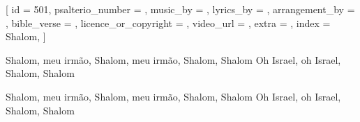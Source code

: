 % 

[
    id                     = {501},
    psalterio_number       = {},
    music_by               = {},
    lyrics_by              = {},
    arrangement_by         = {},
    bible_verse            = {},
    licence_or_copyright   = {},
    video_url              = {},
    extra                  = {},
    index                  = {Shalom},
]


\beginverse
Shalom, meu irmão, Shalom, meu irmão, Shalom, Shalom
Oh Israel, oh Israel, Shalom, Shalom
\endverse


\beginverse
Shalom, meu irmão, Shalom, meu irmão, Shalom, Shalom
Oh Israel, oh Israel, Shalom, Shalom
\endverse

\endsong
